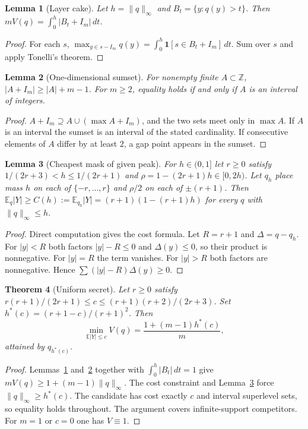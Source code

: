 \documentclass{article}
\newtheorem{theorem}{Theorem}[section]
\newtheorem{lemma}[theorem]{Lemma}
\theoremstyle{definition}
\theoremstyle{remark}
\newcommand{\Z}{\mathbb{Z}}
\newcommand{\E}{\mathbb{E}}
\begin{document}
\begin{lemma}[Layer cake]\label{lem:layer}
Let \(h=\|q\|_\infty\) and \(B_t=\{y:q(y)>t\}\). Then \(mV(q)=\int_0^h|B_t+I_m|\,dt\).
\end{lemma}
\begin{proof}
For each \(s\), \(\max_{y\in s-I_m}q(y)=\int_0^h\mathbf 1[s\in B_t+I_m]\,dt\). Sum over \(s\) and apply Tonelli's theorem.
\end{proof}

\begin{lemma}[One-dimensional sumset]\label{lem:sumset}
For nonempty finite \(A\subset\Z\), \(|A+I_m|\ge|A|+m-1\). For \(m\ge2\), equality holds if and only if \(A\) is an interval of integers.
\end{lemma}
\begin{proof}
\(A+I_m\supseteq A\cup(\max A+I_m)\), and the two sets meet only in \(\max A\). If \(A\) is an interval the sumset is an interval of the stated cardinality. If consecutive elements of \(A\) differ by at least \(2\), a gap point appears in the sumset.
\end{proof}

\begin{lemma}[Cheapest mask of given peak]\label{lem:fill}
For \(h\in(0,1]\) let \(r\ge0\) satisfy \(1/(2r+3)<h\le1/(2r+1)\) and \(\rho=1-(2r+1)h\in[0,2h)\). Let \(q_h\) place mass \(h\) on each of \(\{-r,\dots,r\}\) and \(\rho/2\) on each of \(\pm(r+1)\). Then \(\E_q|Y|\ge C(h):=\E_{q_h}|Y|=(r+1)(1-(r+1)h)\) for every \(q\) with \(\|q\|_\infty\le h\).
\end{lemma}
\begin{proof}
Direct computation gives the cost formula. Let \(R=r+1\) and \(\Delta=q-q_h\). For \(|y|<R\) both factors \(|y|-R\le0\) and \(\Delta(y)\le0\), so their product is nonnegative. For \(|y|=R\) the term vanishes. For \(|y|>R\) both factors are nonnegative. Hence \(\sum(|y|-R)\Delta(y)\ge0\).
\end{proof}

\begin{theorem}[Uniform secret]\label{thm:uniform}
Let \(r\ge0\) satisfy \(r(r+1)/(2r+1)\le c\le(r+1)(r+2)/(2r+3)\). Set \(h^*(c)=(r+1-c)/(r+1)^2\). Then
\[
\min_{\E|Y|\le c}V(q)=\frac{1+(m-1)h^*(c)}{m},
\]
attained by \(q_{h^*(c)}\).
\end{theorem}
\begin{proof}
Lemmas~\ref{lem:layer} and~\ref{lem:sumset} together with \(\int_0^h|B_t|\,dt=1\) give \(mV(q)\ge1+(m-1)\|q\|_\infty\). The cost constraint and Lemma~\ref{lem:fill} force \(\|q\|_\infty\ge h^*(c)\). The candidate has cost exactly \(c\) and interval superlevel sets, so equality holds throughout. The argument covers infinite-support competitors. For \(m=1\) or \(c=0\) one has \(V\equiv1\).
\end{proof}
\end{document}
